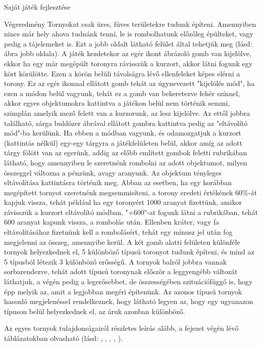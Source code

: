 \begin{MyChapter}{Saját játék fejlesztése}
\begin{MySection}{Végeredmény}
		Tornyokat csak üres, füves területekre tudunk építeni. Amennyiben nincs már hely ahova tudnánk tenni, le is rombolhatunk előzőleg épülteket, vagy pedig a tájelemeket is. Ezt a jobb oldalt látható felület által tehetjük meg (lásd:  ábra jobb oldala).		
		A játék kezdetekor az egér ikont ábrázoló gomb van kijelölve, ekkor ha egy már megépült toronyra rávisszük a kurzort, akkor látni fogunk egy kört körülötte. Ezen a körön belüli távolságra lévő ellenfeleket képes elérni a torony. Ez az egér ikonnal ellátott gomb tehát az úgynevezett "kijelölés mód", ha ezen a módon belül vagyunk, tehát ez a gomb van bekeretezve fehér színnel, akkor egyes objektumokra kattintva a játékon belül nem történik semmi, szimplán amelyik mező felett van a kurzorunk, az lesz kijelölve.
		Az ettől jobbra található, sárga buldózer ábrával ellátott gombra kattintva pedig az "eltávolító mód"-ba kerülünk. Ha ebben a módban vagyunk, és odamozgatjuk a kurzort (kattintás nélkül) egy-egy tárgyra a játékfelületen belül, akkor amíg az adott tárgy fölött van az egerünk, addig az előbb említett gombok feletti rubrikában látható, hogy amennyiben le szeretnénk rombolni az adott objektumot, milyen összeggel változna a pénzünk, avagy aranyunk. Az objektum tényleges eltávolítása kattintásra történik meg.
		Abban az esetben, ha egy korábban megépített tornyot szeretnénk megsemmisíteni, a torony eredeti értékének 60\%-át kapjuk vissza, tehát például ha egy toronyért 1000 aranyat fizettünk, amikor rávisszük a kurzort eltávolító módban, "+600"-at fogunk látni a rubrikában, tehát 600 aranyat kapunk vissza, a rombolás után. Ellenben kráter, vagy fa eltávolításához fizetnünk kell a rombolásért, tehát egy mínusz jel után fog megjelenni az összeg, amennyibe kerül.
		A két gomb alatti felületen különféle tornyok helyezkednek el, 5 különböző típusú toronyot tudunk építeni, és mind az 5 típusból létezik 3 különböző erősségű.
		A tornyok balról jobbra vannak sorbarendezve, tehát adott típusú toronynak először a leggyengébb változát láthatjuk, a végén pedig a legerősebbet, de összességében szituációfüggő is, hogy épp melyik az, amit a legjobban megéri építenünk. Az azonos típusú tornyok hasonló megjelenéssel rendelkeznek, hogy látható legyen az, hogy egy ugyanazon típuson belül helyezkednek el, az áruk azonban különböző.
		
		Az egyes tornyok tulajdonságairól részletes leírás alább, a fejezet végén lévő táblázatokban olvasható (lásd: , , , , ).
		

\end{MySection}
\end{MyChapter}
